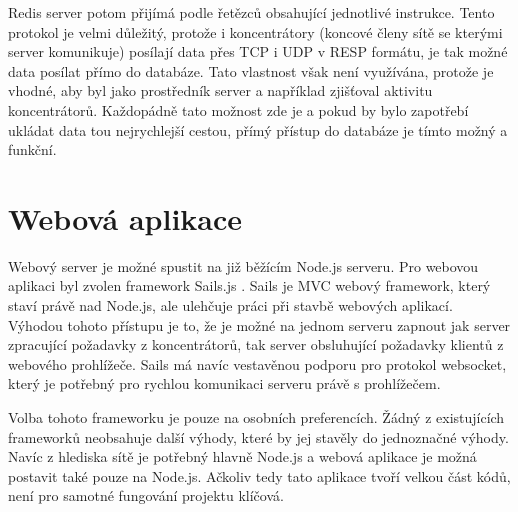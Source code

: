 Redis server potom přijímá podle řetězců obsahující jednotlivé instrukce. Tento protokol je velmi důležitý, protože i koncentrátory (koncové členy sítě se kterými server komunikuje) posílají data přes TCP i UDP v RESP formátu, je tak možné data posílat přímo do databáze. Tato vlastnost však není využívána, protože je vhodné, aby byl jako prostředník server a na\-pří\-klad zjišťoval aktivitu koncentrátorů. Každopádně tato možnost zde je a pokud by bylo zapotřebí ukládat data tou nejrychlejší cestou, přímý přístup do databáze je tímto možný a funkční.

\section{Webová aplikace}
Webový server je možné spustit na již běžícím Node.js serveru. Pro webovou aplikaci byl zvolen framework Sails.js \cite{sails}. Sails  je MVC webový framework, který staví právě nad Node.js,  ale ulehčuje práci při stavbě webových aplikací. Výhodou tohoto přístupu je to, že je možné na jednom serveru zapnout jak server zpracující požadavky z koncentrátorů, tak server obsluhující požadavky klientů z webového prohlížeče. Sails má navíc vestavěnou podporu pro protokol websocket, který je potřebný pro rychlou komunikaci serveru právě s prohlížečem. 

Volba tohoto frameworku je pouze na osobních preferencích. Žádný z existujících frameworků neobsahuje další výhody, které by jej stavěly do jednoznačné výhody. Navíc z hlediska sítě je potřebný hlavně Node.js a webová aplikace je možná postavit také pouze na Node.js. Ačkoliv tedy tato aplikace tvoří velkou část kódů, není pro samotné fungování projektu klíčová.